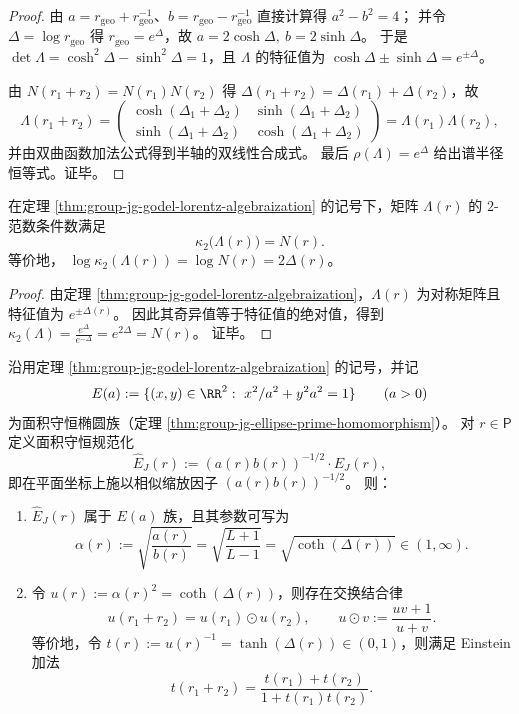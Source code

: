 \begin{proof}
由 \(a=r_{\mathrm{geo}}+r_{\mathrm{geo}}^{-1}\)、\(b=r_{\mathrm{geo}}-r_{\mathrm{geo}}^{-1}\) 直接计算得
\(
a^2-b^2=4
\)；
并令 \(\Delta=\log r_{\mathrm{geo}}\) 得 \(r_{\mathrm{geo}}=e^{\Delta}\)，故
\(
a=2\cosh\Delta,\ b=2\sinh\Delta
\)。
于是
\(
\det\Lambda=\cosh^2\Delta-\sinh^2\Delta=1
\)，且 \(\Lambda\) 的特征值为 \(\cosh\Delta\pm\sinh\Delta=e^{\pm\Delta}\)。
\par
由 \(N(r_1+r_2)=N(r_1)N(r_2)\) 得 \(\Delta(r_1+r_2)=\Delta(r_1)+\Delta(r_2)\)，故
\[
\Lambda(r_1+r_2)
=
\begin{pmatrix}\cosh(\Delta_1+\Delta_2)&\sinh(\Delta_1+\Delta_2)\\ \sinh(\Delta_1+\Delta_2)&\cosh(\Delta_1+\Delta_2)\end{pmatrix}
=\Lambda(r_1)\Lambda(r_2),
\]
并由双曲函数加法公式得到半轴的双线性合成式。
最后 \(\rho(\Lambda)=e^{\Delta}\) 给出谱半径恒等式。证毕。
\end{proof}

\begin{corollary}\label{cor:group-jg-godel-condition-number-identity}
在定理 \ref{thm:group-jg-godel-lorentz-algebraization} 的记号下，矩阵 \(\Lambda(r)\) 的 \(2\)-范数条件数满足
\[
\kappa_2\bigl(\Lambda(r)\bigr)=N(r).
\]
等价地，
\(
\log \kappa_2(\Lambda(r))=\log N(r)=2\Delta(r)
\)。
\end{corollary}
\begin{proof}
由定理 \ref{thm:group-jg-godel-lorentz-algebraization}，\(\Lambda(r)\) 为对称矩阵且特征值为 \(e^{\pm\Delta(r)}\)。
因此其奇异值等于特征值的绝对值，得到
\(
\kappa_2(\Lambda)=\frac{e^{\Delta}}{e^{-\Delta}}=e^{2\Delta}=N(r)
\)。
证毕。
\end{proof}

\begin{theorem}\label{thm:group-jg-joukowsky-area-preserving-cayley}
沿用定理 \ref{thm:group-jg-godel-lorentz-algebraization} 的记号，并记
\[
E(a):=\{(x,y)\in\RR^2:\ x^2/a^2+y^2a^2=1\}\qquad(a>0)
\]
为面积守恒椭圆族（定理 \ref{thm:group-jg-ellipse-prime-homomorphism}）。
对 \(r\in\mathsf P\) 定义面积守恒规范化
\[
\widehat E_J(r):=(a(r)b(r))^{-1/2}\cdot E_J(r),
\]
即在平面坐标上施以相似缩放因子 \((a(r)b(r))^{-1/2}\)。
则：
\begin{enumerate}
  \item \(\widehat E_J(r)\) 属于 \(E(a)\) 族，且其参数可写为
  \[
  \alpha(r):=\sqrt{\frac{a(r)}{b(r)}}
  =\sqrt{\frac{L+1}{L-1}}
  =\sqrt{\coth(\Delta(r))}\in(1,\infty).
  \]
  \item 令 \(u(r):=\alpha(r)^2=\coth(\Delta(r))\)，则存在交换结合律
  \[
  u(r_1+r_2)=u(r_1)\odot u(r_2),
  \qquad
  u\odot v:=\frac{uv+1}{u+v}.
  \]
  等价地，令 \(t(r):=u(r)^{-1}=\tanh(\Delta(r))\in(0,1)\)，则满足 Einstein 加法
  \[
  t(r_1+r_2)=\frac{t(r_1)+t(r_2)}{1+t(r_1)t(r_2)}.
  \]
\end{enumerate}
\end{theorem}


